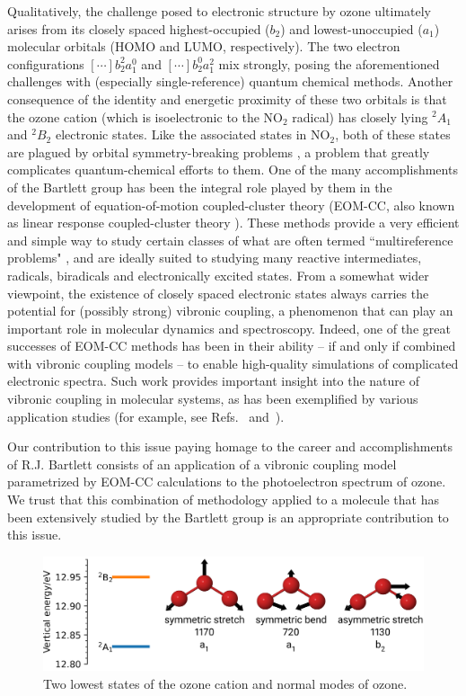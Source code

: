 \documentclass[12pt,pra,aps,superscriptaddress]{revtex4-2}
\begin{document}
Qualitatively, the challenge posed to electronic structure by ozone ultimately
arises from its closely spaced highest-occupied ($b_2$) and lowest-unoccupied
($a_1$) molecular orbitals (HOMO and LUMO, respectively).  The two electron
configurations $[\cdots]b_2^2 a_1^0$ and $[\cdots]b_2^0 a_1^2$ mix strongly,
posing the aforementioned challenges with (especially single-reference)
quantum chemical methods.   Another consequence of the identity and energetic
proximity of these two orbitals is that the ozone cation (which is
isoelectronic to the NO$_2$ radical) has closely lying $^2A_1$ and $^2B_2$
electronic states.   Like the associated states in NO$_2$, both of these
states are plagued by orbital symmetry-breaking problems
\cite{Davidson:SymmBreak:76}, a problem that greatly complicates
quantum-chemical efforts to them.   One of the many accomplishments of the
Bartlett group has been the integral role played by them in the development of
equation-of-motion coupled-cluster theory \cite{Stanton:93:EOMCC,
Nooijen:EOMEA:95, Bartlett:CC_review:07} (EOM-CC, also known as linear
response coupled-cluster theory \cite{Koch:90:LinResp}). These methods provide
a very efficient and simple way to study certain classes of what are often
termed ``multireference problems" \cite{Krylov:EOMRev:07}, and are ideally
suited to studying many reactive intermediates, radicals, biradicals and
electronically excited states.   From a somewhat wider viewpoint, the
existence of closely spaced electronic states always carries the potential for
(possibly strong) vibronic coupling, a phenomenon that can play an important
role in molecular dynamics and spectroscopy.  Indeed, one of the great
successes of EOM-CC methods has been in their ability -- if and only if
combined with vibronic coupling models -- to enable high-quality simulations
of complicated electronic spectra.   Such work provides important insight into
the nature of vibronic coupling in molecular systems, as has been exemplified
by various application studies (for example, see Refs.~\cite{Stanton:NO3:07}
and~\cite{Koppel:02}).

Our contribution to this issue paying homage to the career and accomplishments
of R.J. Bartlett consists of an application of a vibronic coupling model
parametrized by EOM-CC calculations to the photoelectron spectrum of ozone.
We trust that this combination of methodology applied to a molecule that has
been extensively studied by the Bartlett group is an appropriate contribution
to this issue.

\begin{figure}
    \includegraphics[width = 16 cm]{./figures/ozone_intro}
    \caption{ 
        Two lowest states of the ozone cation and normal modes of ozone.
    }
    \label{fig:ozone_intro}
\end{figure}
\end{document}
